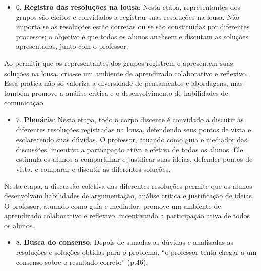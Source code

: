 \begin{itemize}
    \item 6. \textbf{Registro das resoluções na lousa}: Nesta etapa, representantes dos grupos são eleitos e convidados a registrar suas resoluções na lousa. Não importa se as resoluções estão corretas ou se são constituídas por diferentes processos; o objetivo é que todos os alunos analisem e discutam as soluções apresentadas, junto com o professor.
\end{itemize}

Ao permitir que os representantes dos grupos registrem e apresentem suas soluções na lousa, cria-se um ambiente de aprendizado colaborativo e reflexivo. Essa prática não só valoriza a diversidade de pensamentos e abordagens, mas também promove a análise crítica e o desenvolvimento de habilidades de comunicação.


\begin{itemize}
    \item 7. \textbf{Plenária}: Nesta etapa, todo o corpo discente é convidado a discutir as diferentes resoluções registradas na lousa, defendendo seus pontos de vista e esclarecendo suas dúvidas. O professor, atuando como guia e mediador das discussões, incentiva a participação ativa e efetiva de todos os alunos. Ele estimula os alunos a compartilhar e justificar suas ideias, defender pontos de vista, e comparar e discutir as diferentes soluções.
\end{itemize}

Nesta etapa, a discussão coletiva das diferentes resoluções permite que os alunos desenvolvam habilidades de argumentação, análise crítica e justificação de ideias. O professor, atuando como guia e mediador, promove um ambiente de aprendizado colaborativo e reflexivo, incentivando a participação ativa de todos os alunos.


\begin{itemize}
    \item 8. \textbf{Busca do consenso}: Depois de sanadas as dúvidas e analisadas as resoluções e soluções obtidas para o problema, ``o professor tenta chegar a um consenso sobre o resultado correto'' \cite{resolucaoDeProblemas2019} (p.46).
\end{itemize}

